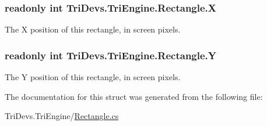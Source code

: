 \hypertarget{struct_tri_devs_1_1_tri_engine_1_1_rectangle_a7aa76fc1fe420a06617ed0642f4aaca0}{
\subsubsection[{X}]{\setlength{\rightskip}{0pt plus 5cm}readonly int Tri\-Devs.\-Tri\-Engine.\-Rectangle.\-X}}\label{struct_tri_devs_1_1_tri_engine_1_1_rectangle_a7aa76fc1fe420a06617ed0642f4aaca0}


The X position of this rectangle, in screen pixels. 

\hypertarget{struct_tri_devs_1_1_tri_engine_1_1_rectangle_acca174d01cbb82151fc769fcaf7a97e4}{
\subsubsection[{Y}]{\setlength{\rightskip}{0pt plus 5cm}readonly int Tri\-Devs.\-Tri\-Engine.\-Rectangle.\-Y}}\label{struct_tri_devs_1_1_tri_engine_1_1_rectangle_acca174d01cbb82151fc769fcaf7a97e4}


The Y position of this rectangle, in screen pixels. 



The documentation for this struct was generated from the following file\-:\begin{DoxyCompactItemize}
\item 
Tri\-Devs.\-Tri\-Engine/\hyperlink{_rectangle_8cs}{Rectangle.\-cs}\end{DoxyCompactItemize}
